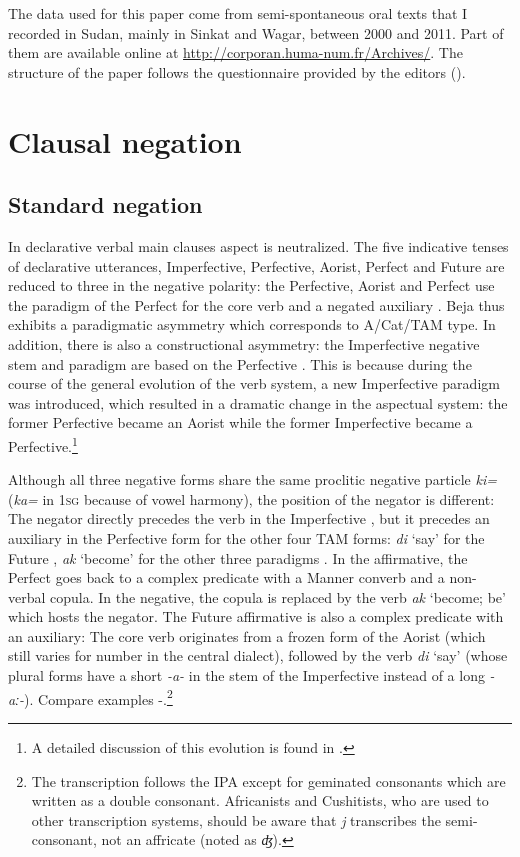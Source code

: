 \documentclass[output=paper,colorlinks,citecolor=brown]{langscibook}
\begin{document}
The data used for this paper come from semi-spontaneous oral texts that I recorded in Sudan, mainly in Sinkat and Wagar, between 2000 and 2011. Part of them are available online at \url{http://corporan.huma-num.fr/Archives/}. The structure of the paper follows the questionnaire provided by the editors ().

\section{Clausal negation}

\subsection{Standard negation}
\label{sec:beja:2.1}
In declarative verbal main clauses aspect is neutralized. The five indicative tenses of declarative utterances, Imperfective, Perfective, Aorist, Perfect and Future are reduced to three in the negative polarity: the Perfective, Aorist and Perfect use the paradigm of the Perfect for the core verb and a negated auxiliary . Beja thus exhibits a paradigmatic asymmetry which corresponds to  A/Cat/TAM type. In addition, there is also a constructional asymmetry: the Imperfective negative stem and paradigm are based on the Perfective . This is because during the course of the general evolution of the verb system, a new Imperfective paradigm was introduced, which resulted in a dramatic change in the aspectual system: the former Perfective became an Aorist while the former Imperfective became a Perfective.\footnote{A detailed discussion of this evolution is found in \citet{Cohen1972, Cohen1973}.}

Although all three negative forms share the same proclitic negative particle \textit{ki=} (\textit{ka=} in 1\textsc{sg} because of vowel harmony), the position of the negator is different: The negator directly precedes the verb in the Imperfective , but it precedes an auxiliary in the Perfective form for the other four TAM forms: \textit{di} ‘say’ for the Future , \textit{ak} ‘become’ for the other three paradigms . In the affirmative, the Perfect goes back to a complex predicate with a Manner converb and a non-verbal copula. In the negative, the copula is replaced by the verb \textit{ak} ‘become; be’ which hosts the negator. The Future affirmative is also a complex predicate with an auxiliary: The core verb originates from a frozen form of the Aorist (which still varies for number in the central dialect), followed by the verb \textit{di} ‘say’ (whose plural forms have a short \textit{-a-} in the stem of the Imperfective instead of a long \textit{-aː-}). Compare examples -.\footnote{The transcription follows the IPA except for geminated consonants which are written as a double consonant. Africanists and Cushitists, who are used to other transcription systems, should be aware that \textit{j} transcribes the semi-consonant, not an affricate (noted as \textit{ʤ}).}
\end{document}
